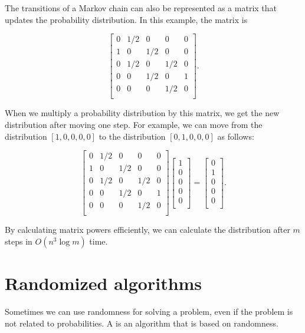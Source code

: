 The transitions of a Markov chain can also be
represented as a matrix that updates the
probability distribution.
In this example, the matrix is

\[ 
 \begin{bmatrix}
  0 & 1/2 & 0 & 0 & 0 \\
  1 & 0 & 1/2 & 0 & 0 \\
  0 & 1/2 & 0 & 1/2 & 0 \\
  0 & 0 & 1/2 & 0 & 1 \\
  0 & 0 & 0 & 1/2 & 0 \\
 \end{bmatrix}.
\]

When we multiply a probability distribution by this matrix,
we get the new distribution after moving one step.
For example, we can move from the distribution
$[1,0,0,0,0]$ to the distribution
$[0,1,0,0,0]$ as follows:

\[ 
 \begin{bmatrix}
  0 & 1/2 & 0 & 0 & 0 \\
  1 & 0 & 1/2 & 0 & 0 \\
  0 & 1/2 & 0 & 1/2 & 0 \\
  0 & 0 & 1/2 & 0 & 1 \\
  0 & 0 & 0 & 1/2 & 0 \\
 \end{bmatrix}
 \begin{bmatrix}
  1 \\
  0 \\
  0 \\
  0 \\
  0 \\
 \end{bmatrix}
=
 \begin{bmatrix}
  0 \\
  1 \\
  0 \\
  0 \\
  0 \\
 \end{bmatrix}.
\]

By calculating matrix powers efficiently,
we can calculate the distribution after $m$ steps
in $O(n^3 \log m)$ time.

\section{Randomized algorithms}


Sometimes we can use randomness for solving a problem,
even if the problem is not related to probabilities.
A  is an algorithm that
is based on randomness.

